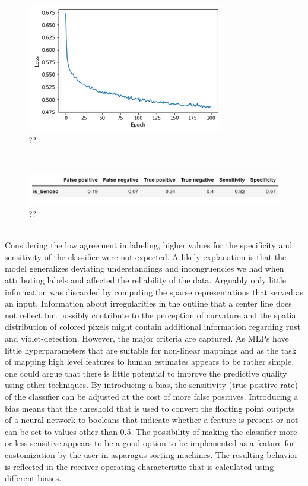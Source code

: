 \begin{figure}[h]
	\centering
	\includegraphics[scale=0.6]{Figures/chapter04/fe_curve}
	\decoRule
	\caption[??]{??}
	\label{fig:FeatureEngineeringCurve}
\end{figure}
\\
\begin{figure}[h]
	\centering
	\includegraphics[scale=0.6]{Figures/chapter04/fe_curve_table}
	\decoRule
	\caption[??]{??}
	\label{fig:FeatureEngineeringCurveTable}
\end{figure}
\\
Considering the low agreement in labeling, higher values for the specificity and sensitivity of the classifier were not expected. A likely explanation is that the model generalizes deviating understandings and incongruencies we had when attributing labels and affected the reliability of the data. Arguably only little information was discarded by computing the sparse representations that served as an input. Information about irregularities in the outline that a center line does not reflect but possibly contribute to the perception of curvature and the spatial distribution of colored pixels might contain additional information regarding rust and violet-detection. However, the major criteria are captured. As MLPs have little hyperparameters that are suitable for non-linear mappings and  as the task of mapping high level features to human estimates appears to be rather simple, one could argue that there is little potential to improve the predictive quality using other techniques. By introducing a bias, the sensitivity (true positive rate) of the classifier can be adjusted at the cost of more false positives. Introducing a bias means that the threshold that is used to convert the floating point outputs of a neural network to booleans that indicate whether a feature is present or not can be set to values other than 0.5. The possibility of making the classifier more or less sensitive appears to be a good option to be implemented as a feature for customization by the user in asparagus sorting machines. The resulting behavior is reflected in the receiver operating characteristic that is calculated using different biases. \\
